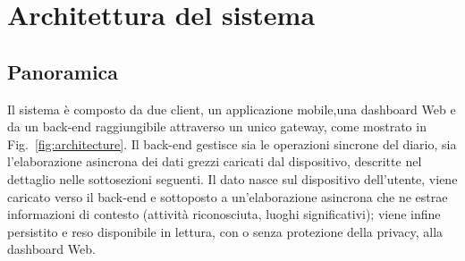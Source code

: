 \documentclass[conference]{IEEEtran}
\begin{document}
\section{Architettura del sistema}
\label{sec:architecture}

\subsection{Panoramica}

Il sistema è composto da due client, un applicazione mobile,una
dashboard Web e da un back-end raggiungibile attraverso un unico
gateway, come mostrato in Fig.~\ref{fig:architecture}. Il back-end
gestisce sia le operazioni sincrone del diario, sia l'elaborazione
asincrona dei dati grezzi caricati dal dispositivo, descritte nel
dettaglio nelle sottosezioni seguenti. Il dato nasce sul dispositivo
dell'utente, viene caricato verso il back-end e sottoposto a
un'elaborazione asincrona che ne estrae informazioni di contesto
(attività riconosciuta, luoghi significativi); viene infine
persistito e reso disponibile in lettura, con o senza protezione
della privacy, alla dashboard Web.
\end{document}
